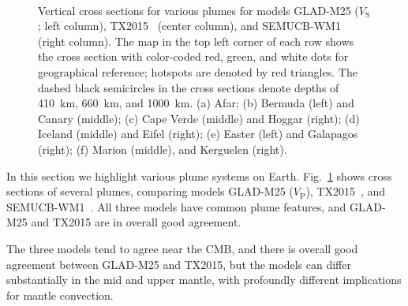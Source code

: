 \begin{figure}[ht!]
    \\
    \caption[Vertical cross sections of shear wavespeed perturbations for various plumes]
    {\small{Vertical cross sections for various plumes for models GLAD-M25 ($V_\textrm{S}$; left column), TX2015~\cite{TX2015} (center column), and SEMUCB-WM1~\cite{french2015broad} (right column).
    The map in the top left corner of each row shows the cross section with color-coded red, green, and white dots for geographical reference;
    hotspots are denoted by red triangles.
    The dashed black semicircles in the cross sections denote depths of 410~km, 660~km, and 1000~km.
    (a) Afar; (b) Bermuda (left) and Canary (middle); (c) Cape Verde (middle) and Hoggar (right); (d) Iceland (middle) and Eifel (right); (e) Easter (left) and Galapagos (right); (f) Marion (middle), and Kerguelen (right). }}
    \label{fig:plumes}
\end{figure}

In this section we highlight various plume systems on Earth. Fig.~\ref{fig:plumes}
shows cross sections of several plumes, comparing models GLAD-M25 ($V_\textrm{P}$),
TX2015~\cite{TX2015}, and SEMUCB-WM1~\cite{french2015broad}.
All three models have common plume features,
and GLAD-M25 and TX2015 are in overall good agreement.  

The three models tend to agree near the CMB,
and there is overall good agreement between GLAD-M25 and TX2015,
but the models can differ substantially in the mid and upper mantle,
with profoundly different implications for mantle
convection.

